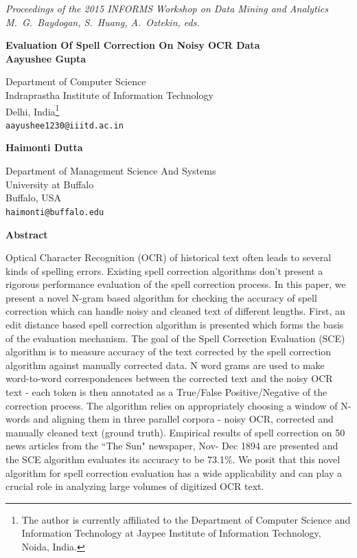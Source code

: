 \documentclass[12pt]{article}
\begin{document}
\noindent
\footnotesize{
\noindent
\textit{Proceedings of the 2015 INFORMS Workshop on Data Mining and Analytics\\
\noindent
M.~G.~Baydogan, S.~Huang, A.~Oztekin, eds.}}

\vspace{0.1in}
\begin{center}
    {\large\bf Evaluation Of Spell Correction On Noisy OCR Data}\\
    \vspace{0.3in}
\textbf{Aayushee Gupta}

Department of Computer Science\\
Indraprastha Institute of Information Technology\\
Delhi, India\footnote{The author is currently affiliated to the Department of Computer Science and Information Technology at Jaypee Institute of Information Technology, Noida, India.}\\
\texttt{aayushee1230@iiitd.ac.in}\\
\vspace{0.2in}

\textbf{Haimonti Dutta}

Department of Management Science And Systems\\
University at Buffalo\\
Buffalo, USA\\
\texttt{haimonti@buffalo.edu}\\
\end{center}


\begin{center}
    {\bf Abstract}\\

\end{center}
\noindent
Optical Character Recognition (OCR) of historical text often leads to several kinds of spelling errors. Existing spell correction algorithms don't present a rigorous performance evaluation of the spell correction process. In this paper, we present a novel N-gram based algorithm for checking the accuracy of spell correction which can handle noisy and cleaned text of different lengths. First, an edit distance based spell correction algorithm is presented which forms the basis of the evaluation mechanism. The goal of the Spell Correction Evaluation (SCE) algorithm is to measure accuracy of the text corrected by the spell correction algorithm against manually corrected data. N word grams are used to make word-to-word correspondences between the corrected text and the noisy OCR text - each token is then annotated as a True/False Positive/Negative of the correction process. The algorithm relies on appropriately choosing a window of N-words and aligning them in three parallel corpora - noisy OCR, corrected and manually cleaned text (ground truth). Empirical results of spell correction on 50 news articles from the ``The Sun" newspaper, Nov- Dec 1894 are presented and the SCE algorithm evaluates its accuracy to be 73.1\%. We posit that this novel algorithm for spell correction evaluation has a wide applicability and can play a crucial role in analyzing large volumes of digitized OCR text.
\end{document}
